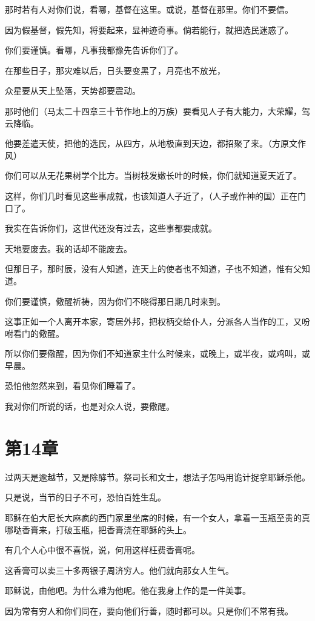 \documentclass[12pt,oneside]{book}
\begin{document}
那时若有人对你们说，看哪，基督在这里。或说，基督在那里。你们不要信。

因为假基督，假先知，将要起来，显神迹奇事。倘若能行，就把选民迷惑了。

你们要谨慎。看哪，凡事我都豫先告诉你们了。

在那些日子，那灾难以后，日头要变黑了，月亮也不放光，

众星要从天上坠落，天势都要震动。

那时他们（马太二十四章三十节作地上的万族）要看见人子有大能力，大荣耀，驾云降临。

他要差遣天使，把他的选民，从四方，从地极直到天边，都招聚了来。（方原文作风）

你们可以从无花果树学个比方。当树枝发嫩长叶的时候，你们就知道夏天近了。

这样，你们几时看见这些事成就，也该知道人子近了，（人子或作神的国）正在门口了。

我实在告诉你们，这世代还没有过去，这些事都要成就。

天地要废去。我的话却不能废去。

但那日子，那时辰，没有人知道，连天上的使者也不知道，子也不知道，惟有父知道。

你们要谨慎，儆醒祈祷，因为你们不晓得那日期几时来到。

这事正如一个人离开本家，寄居外邦，把权柄交给仆人，分派各人当作的工，又吩咐看门的儆醒。

所以你们要儆醒，因为你们不知道家主什么时候来，或晚上，或半夜，或鸡叫，或早晨。

恐怕他忽然来到，看见你们睡着了。

我对你们所说的话，也是对众人说，要儆醒。

\chapter{第14章}
过两天是逾越节，又是除酵节。祭司长和文士，想法子怎吗用诡计捉拿耶稣杀他。

只是说，当节的日子不可，恐怕百姓生乱。

耶稣在伯大尼长大麻疯的西门家里坐席的时候，有一个女人，拿着一玉瓶至贵的真哪哒香膏来，打破玉瓶，把香膏浇在耶稣的头上。

有几个人心中很不喜悦，说，何用这样枉费香膏呢。

这香膏可以卖三十多两银子周济穷人。他们就向那女人生气。

耶稣说，由他吧。为什么难为他呢。他在我身上作的是一件美事。

因为常有穷人和你们同在，要向他们行善，随时都可以。只是你们不常有我。
\end{document}

